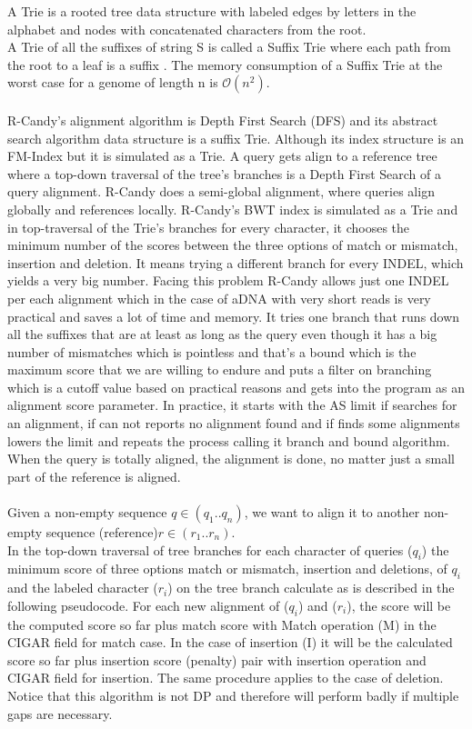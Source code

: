 \documentclass[11pt,a4paper]{report}
\begin{document}
A Trie is a rooted tree data structure with labeled edges 
by letters in the alphabet and nodes with concatenated 
characters from the root\cite{trie}.\\ 
A Trie of all the suffixes of string S is called a Suffix 
Trie where each path from the root to a leaf is a suffix 
\cite{gusfield1997algorithms}.
The memory consumption of a Suffix Trie at the worst case 
for a genome of length n is  $\mathcal{O} (n^{2})$.
\\\\
R-Candy's alignment algorithm is Depth First Search
(DFS) and its abstract search algorithm data structure
 is a suffix Trie.  Although its index structure is an FM-Index 
but it is simulated as a Trie.
A query gets align to a reference tree where a 
 top-down traversal of the tree's branches is a Depth
First Search of a query alignment.
R-Candy does a semi-global alignment, where queries 
align globally and  references locally.
R-Candy's BWT index is simulated as a Trie  
and in top-traversal of the Trie's branches for every 
character, it chooses the minimum number of the scores between
the three options of match or mismatch, insertion and deletion.
It means trying a different branch for every INDEL, 
which yields a very big number. Facing this problem 
R-Candy allows just one INDEL per each alignment which
in the case of aDNA with very short reads is very practical
and saves a lot of time and memory.
It tries one branch that runs down all the suffixes that are
at least as long as the query even though it has a big 
number of mismatches which is pointless and that's a
bound which is the maximum score that we are willing 
to endure and puts a filter on branching which is a cutoff 
value based on practical reasons and gets into the program
as an alignment score parameter. In practice, it starts with 
the AS limit if searches for an alignment, if can not reports 
no alignment found and if finds some alignments lowers the 
limit and repeats the process calling it branch and bound
algorithm.
 When the query is totally aligned, the alignment is 
done, no matter just a small part of the reference is aligned.
\\\\
Given a non-empty sequence $q\in (q_{1}..q_{n})$, we want to align it to 
another non-empty sequence (reference)$r\in (r_{1}..r_{n})$.\\
In the top-down traversal of tree branches for each character 
of queries ($q_{i}$) the minimum score of three options match or mismatch, 
insertion and deletions, of $q_{i}$  and the labeled character ($r_{i}$)
on the tree branch calculate as is described in the following pseudocode.
For each new alignment of ($q_{i}$) and ($r_{i}$), the score will be the
computed score so far plus match score with Match operation (M) in the 
CIGAR field \cite{samtools} for match case. In the case of insertion (I) 
it will be the calculated score so far plus insertion score (penalty) pair 
with insertion operation and CIGAR field for insertion.
The same procedure applies to the case of deletion.
Notice that this algorithm is not DP and therefore will
perform badly if multiple gaps are necessary.\\
\end{document}
